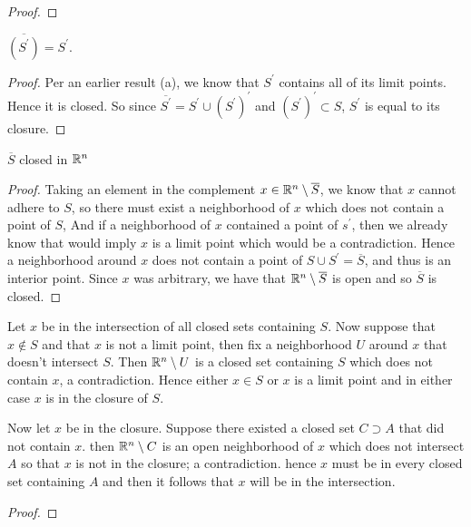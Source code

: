 \begin{alphaparts}
\begin{proof}
        \end{proof}

        \questionpart
        $\overline{(S^\prime)} = S^\prime$. 

        \begin{proof}
            Per an earlier result (a), we know that $S^\prime$ contains all of its limit points. Hence 
            it is closed. So since $\overline{S^\prime} = S^\prime \cup (S^\prime)^\prime$ and $(S^\prime)^\prime \subset S$, $S^\prime$ is equal to 
            its closure. 
        \end{proof}


        \questionpart 
        $\overline{S}$ closed in $\mathbb{R}^n$

        \begin{proof}
            Taking an element in the complement $x \in \mathbb{R}^n \setminus \overline{S}$, we know that $x$ cannot adhere to $S$, 
            so there must exist a neighborhood of $x$ which does not contain a point of $S$, And if a neighborhood of $x$ contained a point of $s^\prime$, 
            then we already know that would imply $x$ is a limit point which would be a contradiction. Hence  a neighborhood around $x$ does not 
            contain a point of $S \cup S^\prime = \overline{S}$, and thus is an interior point. Since $x$ was arbitrary, we have that 
            $\mathbb{R}^n \setminus \overline{S}$ is open and so $\overline{S}$ is closed. 

        \end{proof}

        \questionpart 
        Let $x$ be in the intersection of all closed sets containing $S$. Now suppose that $x \notin S$  and that $x$ is not a limit point, 
        then fix a neighborhood $U$ around $x$ that doesn't intersect $S$. Then $\mathbb{R}^n \setminus U$ is a closed set containing $S$ which does not contain $x$, a contradiction. 
        Hence either $x \in S$ or $x$ is a limit point and in either case $x$ is in the closure of $S$. 

        Now let $x$ be in the closure. Suppose there existed a closed set $C \supset A$ that did not contain $x$. 
        then $\mathbb{R}^n \setminus C$ is an open neighborhood of $x$ which does not intersect $A$ so that $x$ is not in the closure; a contradiction. 
        hence $x$ must be in every closed set containing $A$ and then it follows that $x$ will be in the intersection. 
        \begin{proof}
            
        \end{proof}
    \end{alphaparts}

